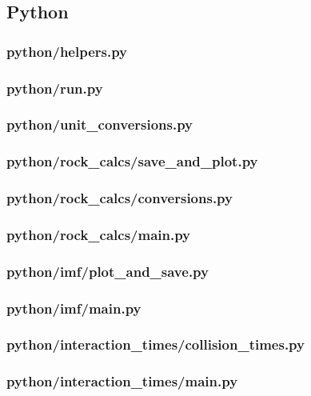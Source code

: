 \subsection{Python}
\subsubsection{python/helpers.py}

\subsubsection{python/run.py}

\subsubsection{python/unit_conversions.py}

\subsubsection{python/rock_calcs/save_and_plot.py}

\subsubsection{python/rock_calcs/conversions.py}

\subsubsection{python/rock_calcs/main.py}

\subsubsection{python/imf/plot_and_save.py}

\subsubsection{python/imf/main.py}

\subsubsection{python/interaction_times/collision_times.py}

\subsubsection{python/interaction_times/main.py}

